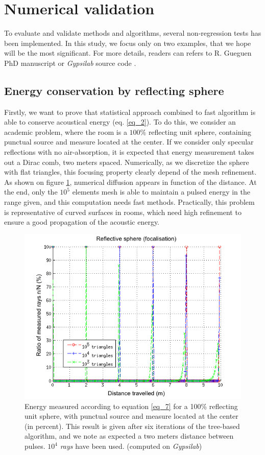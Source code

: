 \documentclass[AMA,STIX1COL]{WileyNJD-v2}
\begin{document}
\section{Numerical validation}
To evaluate and validate methods and algorithms, several non-regression tests has been implemented. In this study, we focus only on two examples, that we hope will be the most significant. For more details, readers can refers to R. Gueguen PhD manuscript \cite{theseRobin} or \textit{Gypsilab} source code \cite{githubGypsi}.   

\subsection{Energy conservation by reflecting sphere}
Firstly, we want to prove that statistical approach combined to fast algorithm is able to conserve acoustical energy (eq. \ref{eq_2}). To do this, we consider an academic problem, where the room is a $100\%$ reflecting unit sphere, containing punctual source and measure located at the center. If we consider only specular reflections with no air-absorption, it is expected that energy measurement takes out a Dirac comb, two meters spaced.
Numerically, as we discretize the sphere with flat triangles, this focusing property clearly depend of the mesh refinement. As shown on figure \ref{test2RIR}, numerical diffusion appears in function of the distance.  At the end, only the $10^5$ elements mesh is able to maintain a pulsed energy in the range given, and this computation needs fast methods. Practically, this problem is representative of curved surfaces in rooms, which need high refinement to ensure a good propagation of the acoustic energy.

\begin{figure}[t]
\centering
		\includegraphics[width=0.6\linewidth]{sphere}
		\caption{Energy measured according to equation \ref{eq_7} for a 100\% reflecting unit sphere, with punctual source and measure located at the center (in percent). This result is given after six iterations of the tree-based algorithm, and we note as expected a two meters distance between pulses. $10^4$ \textit{rays} have been used. (computed on \textit{Gypsilab})}
		\label{test2RIR}
\end{figure}
\end{document}
